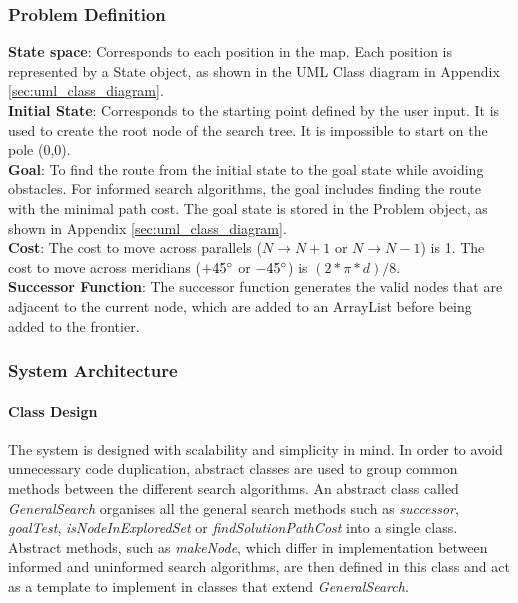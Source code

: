 \documentclass[letterpaper,12pt]{article}
\begin{document}
\subsubsection{Problem Definition}

\textbf{State space}: Corresponds to each position in the map. Each position is represented by a State object, as shown in the UML Class diagram in Appendix \ref{sec:uml_class_diagram}.\\

\textbf{Initial State}: Corresponds to the starting point defined by the user input. It is used to create the root node of the search tree. It is impossible to start on the pole (0,0).\\

\textbf{Goal}: To find the route from the initial state to the goal state while avoiding obstacles. For informed search algorithms, the goal includes finding the route with the minimal path cost. The goal state is stored in the Problem object, as shown in Appendix \ref{sec:uml_class_diagram}.\\

\textbf{Cost}: The cost to move across parallels ($N \rightarrow N+1$ or $N \rightarrow N-1$) is 1. The cost to move across meridians ($+45\degree$ or $-45\degree$) is $(2*\pi*d) / 8$.\\

\textbf{Successor Function}: The successor function generates the valid nodes that are adjacent to the current node, which are added to an ArrayList before being added to the frontier.

\subsubsection{System Architecture}

\paragraph{Class Design}

The system is designed with scalability and simplicity in mind. In order to avoid unnecessary code duplication, abstract classes are used to group common methods between the different search algorithms. An abstract class called \textit{GeneralSearch} organises all the general search methods such as \textit{successor}, \textit{goalTest}, \textit{isNodeInExploredSet} or \textit{findSolutionPathCost} into a single class. Abstract methods, such as \textit{makeNode}, which differ in implementation between informed and uninformed search algorithms, are then defined in this class and act as a template to implement in classes that extend \textit{GeneralSearch}.\\
\end{document}
